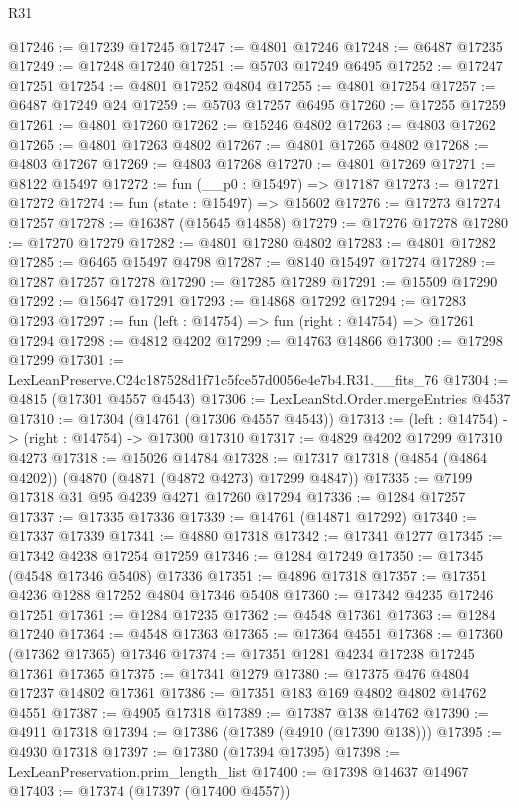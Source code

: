 \begin{lexlean}{R31}
\begin{coremodule}
@17246 := @17239 @17245
@17247 := @4801 @17246
@17248 := @6487 @17235
@17249 := @17248 @17240
@17251 := @5703 @17249 @6495
@17252 := @17247 @17251
@17254 := @4801 @17252 @4804
@17255 := @4801 @17254
@17257 := @6487 @17249 @24
@17259 := @5703 @17257 @6495
@17260 := @17255 @17259
@17261 := @4801 @17260
@17262 := @15246 @4802
@17263 := @4803 @17262
@17265 := @4801 @17263 @4802
@17267 := @4801 @17265 @4802
@17268 := @4803 @17267
@17269 := @4803 @17268
@17270 := @4801 @17269
@17271 := @8122 @15497
@17272 := fun (__p0 : @15497) => @17187
@17273 := @17271 @17272
@17274 := fun (state : @15497) => @15602
@17276 := @17273 @17274 @17257
@17278 := @16387 (@15645 @14858)
@17279 := @17276 @17278
@17280 := @17270 @17279
@17282 := @4801 @17280 @4802
@17283 := @4801 @17282
@17285 := @6465 @15497 @4798
@17287 := @8140 @15497 @17274
@17289 := @17287 @17257 @17278
@17290 := @17285 @17289
@17291 := @15509 @17290
@17292 := @15647 @17291
@17293 := @14868 @17292
@17294 := @17283 @17293
@17297 := fun (left : @14754) => fun (right : @14754) => @17261 @17294
@17298 := @4812 @4202
@17299 := @14763 @14866
@17300 := @17298 @17299
@17301 := LexLeanPreserve.C24c187528d1f71c5fce57d0056e4e7b4.R31.__fits_76
@17304 := @4815 (@17301 @4557 @4543)
@17306 := LexLeanStd.Order.mergeEntries @4537
@17310 := @17304 (@14761 (@17306 @4557 @4543))
@17313 := (left : @14754) -> (right : @14754) -> @17300 @17310
@17317 := @4829 @4202 @17299 @17310 @4273
@17318 := @15026 @14784
@17328 := @17317 @17318 (@4854 (@4864 @4202)) (@4870 (@4871 (@4872 @4273) @17299 @4847))
@17335 := @7199 @17318 @31 @95 @4239 @4271 @17260 @17294
@17336 := @1284 @17257
@17337 := @17335 @17336
@17339 := @14761 (@14871 @17292)
@17340 := @17337 @17339
@17341 := @4880 @17318
@17342 := @17341 @1277
@17345 := @17342 @4238 @17254 @17259
@17346 := @1284 @17249
@17350 := @17345 (@4548 @17346 @5408) @17336
@17351 := @4896 @17318
@17357 := @17351 @4236 @1288 @17252 @4804 @17346 @5408
@17360 := @17342 @4235 @17246 @17251
@17361 := @1284 @17235
@17362 := @4548 @17361
@17363 := @1284 @17240
@17364 := @4548 @17363
@17365 := @17364 @4551
@17368 := @17360 (@17362 @17365) @17346
@17374 := @17351 @1281 @4234 @17238 @17245 @17361 @17365
@17375 := @17341 @1279
@17380 := @17375 @476 @4804 @17237 @14802 @17361
@17386 := @17351 @183 @169 @4802 @4802 @14762 @4551
@17387 := @4905 @17318
@17389 := @17387 @138 @14762
@17390 := @4911 @17318
@17394 := @17386 (@17389 (@4910 (@17390 @138)))
@17395 := @4930 @17318
@17397 := @17380 (@17394 @17395)
@17398 := LexLeanPreservation.prim_length_list
@17400 := @17398 @14637 @14967
@17403 := @17374 (@17397 (@17400 @4557))

\end{coremodule}
\end{lexlean}
